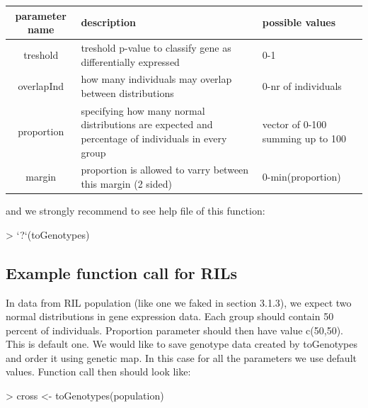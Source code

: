 \documentclass{article}
\begin{document}
 \begin{tabular}{ | c | p{5.5cm} | p{4.5cm}| }
  \hline                       
  parameter name & description & possible values \\ \hline
  treshold & treshold p-value to classify gene as differentially expressed & 0-1 \\ \hline
  overlapInd & how many individuals may overlap between distributions & 0-nr of individuals  \\ \hline
  proportion & specifying how many normal distributions are expected and percentage of individuals in every group  & vector of 0-100 summing up to 100  \\ \hline
  margin & proportion is allowed to varry between this margin (2 sided)  & 0-min(proportion) \\ \hline
\end{tabular}

{\noindent}and we strongly recommend to see help file of this function:
\begin{Schunk}
\begin{Sinput}
> `?`(toGenotypes)
\end{Sinput}
\end{Schunk}

\subsection{Example function call for RILs}
In data from RIL population (like one we faked in section 3.1.3), we expect two normal distributions in gene expression data. Each group should contain 50 percent of individuals. Proportion parameter should then have value c(50,50).
This is default one. We would like to save genotype data created by toGenotypes and order it using genetic map. In this case for all the parameters we use default values.  Function call then should look like:
\begin{Schunk}
\begin{Sinput}
> cross <- toGenotypes(population)
\end{Sinput}
\end{Schunk}
\end{document}
